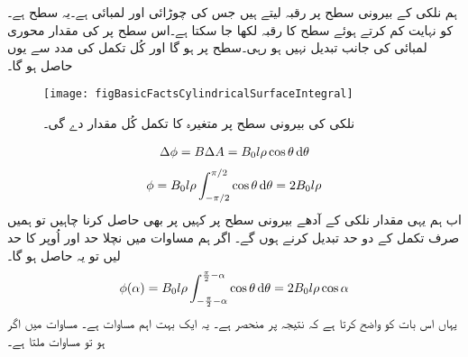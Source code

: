 	ہم نلکی کے بیرونی سطح پر رقبہ   لیتے ہیں جس کی چوڑائی   اور لمبائی  ہے۔یہ سطح  ہے۔ کو نہایت کم کرتے ہوئے سطح کا رقبہ  لکھا جا سکتا ہے۔اس سطح پر  کی مقدار محوری لمبائی  کی جانب تبدیل نہیں ہو رہی۔سطح   پر  ہو گا اور کُل  تکمل کی مدد سے یوں حاصل ہو گا۔
\begin{figure}
\centering
\texttt{[image: figBasicFactsCylindricalSurfaceIntegral]}
\caption{نلکی کی بیرونی سطح پر متغیرہ کا تکمل کُل مقدار دے گی۔}
\label{شکل_حقائق_نلکی_سطحی_تکمل}
\end{figure}
%
\begin{align}
\Delta \phi=B \Delta A=B_0 l \rho \cos \theta \dif \theta
\end{align}
%
\begin{align}\label{مساوات_بنیادی_بہاو_بذریع_تکمل_زاویہ_صفر}
\phi = B_0 l \rho \int_{-\pi/2}^{\pi/2} \cos \theta \dif \theta =2 B_0 l \rho
\end{align}
اب ہم یہی مقدار نلکی کے آدھے بیرونی سطح پر کہیں پر بھی حاصل کرنا چاہیں تو ہمیں صرف تکمل کے دو حد تبدیل کرنے ہوں گے۔  اگر ہم مساوات   میں نچلا حد  اور اُوپر کا حد  لیں تو یہ حاصل ہو گا۔
\begin{align}\label{مساوات_بنیادی_بہاو_بذریع_تکمل_کوئی_زاویہ}
\phi (\alpha) = B_0 l \rho \int_{-\frac{\pi}{2}-\alpha}^{\frac{\pi}{2}-\alpha} \cos \theta \dif \theta =2 B_0 l \rho \cos \alpha
\end{align}
یہاں   اس بات کو واضح کرتا ہے کہ نتیجہ  پر منحصر ہے۔ یہ ایک بہت اہم مساوات ہے۔ مساوات  میں  اگر  ہو تو مساوات    ملتا ہے۔

